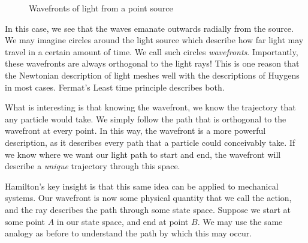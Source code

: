 \begin{figure}[ht]

     \caption{Wavefronts of light from a point source}
     \label{fig:wavefront}
 \end{figure}
In this case, we see that the waves emanate outwards radially from the source. We may imagine circles around the light source which describe how far light may travel in a certain amount of time. We call such circles \textit{wavefronts}. Importantly, these wavefronts are always orthogonal to the light rays! This is one reason that the Newtonian description of light meshes well with the descriptions of Huygens in most cases. Fermat's Least time principle describes both.

What is interesting is that knowing the wavefront, we know the trajectory that any particle would take. We simply follow the path that is orthogonal to the wavefront at every point. In this way, the wavefront is a more powerful description, as it describes every path that a particle could conceivably take. If we know where we want our light path to start and end, the wavefront will describe a \textit{unique} trajectory through this space.

Hamilton's key insight is that this same idea can be applied to mechanical systems. Our wavefront is now some physical quantity that we call the \gls{action}, and the ray describes the path through some state space. Suppose we start at some point $A$ in our state space, and end at point $B$. We may use the same analogy as before to understand the path by which this may occur.

